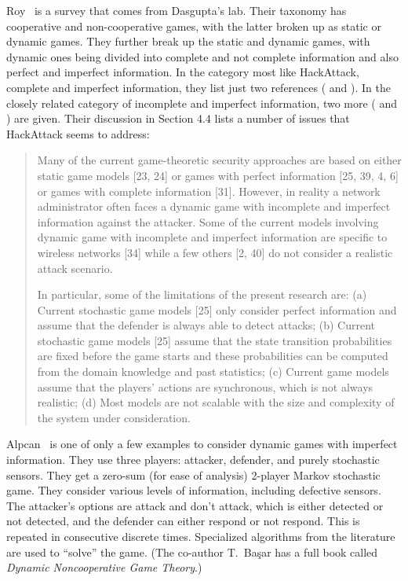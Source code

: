\documentclass{sig-alternate}
\begin{document}
Roy~\cite{roy2010survey} is a survey that comes from Dasgupta's
lab. Their taxonomy has cooperative and non-cooperative games, with
the latter broken up as static or dynamic games. They further break up
the static and dynamic games, with dynamic ones being divided into
complete and not complete information and also perfect and imperfect
information. In the category most like HackAttack, complete and
imperfect information, they list just two references
(\cite{alpcan2006intrusion} and \cite{nguyen2009security}).  In the
closely related category of incomplete and imperfect information, two
more (\cite{alpcan2004game} and \cite{you2003kind}) are given. Their
discussion in Section 4.4 lists a number of issues that HackAttack
seems to address:

\begin{quotation}
Many of the current game-theoretic security approaches are based on
either static game models [23, 24] or games with perfect information
[25, 39, 4, 6] or games with complete information [31]. However, in
reality a network administrator often faces a dynamic game with
incomplete and imperfect information against the attacker. Some of the
current models involving dynamic game with incomplete and imperfect
information are specific to wireless networks [34] while a few others
[2, 40] do not consider a realistic attack scenario.

In particular, some of the limitations of the present research are:
(a) Current stochastic game models [25] only consider perfect
information and assume that the defender is always able to detect
attacks; (b) Current stochastic game models [25] assume that the state
transition probabilities are fixed before the game starts and these
probabilities can be computed from the domain knowledge and past
statistics; (c) Current game models assume that the players’ actions
are synchronous, which is not always realistic; (d) Most models are
not scalable with the size and complexity of the system under
consideration.
\end{quotation}

Alpcan~\cite{alpcan2006intrusion} is one of only a few examples to
consider dynamic games with imperfect information. They use three
players: attacker, defender, and purely stochastic sensors. They get a
zero-sum (for ease of analysis) 2-player Markov stochastic game. They
consider various levels of information, including defective
sensors. The attacker's options are attack and don't attack, which is
either detected or not detected, and the defender can either respond
or not respond. This is repeated in consecutive discrete
times. Specialized algorithms from the literature are used to
``solve'' the game. (The co-author T.~Ba{\c{s}}ar has a full book
called {\em Dynamic Noncooperative Game Theory}.)
\end{document}
